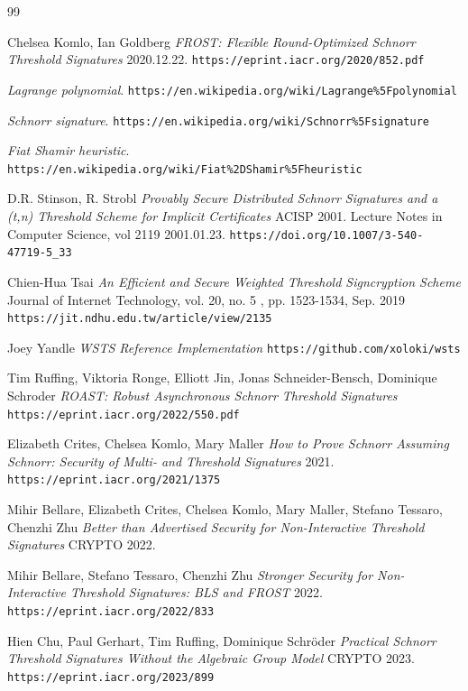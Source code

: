 \documentclass{article}
\theoremstyle{plain}
\theoremstyle{definition}
\theoremstyle{remark}
\begin{document}
\begin{thebibliography}{99}

  Chelsea Komlo, Ian Goldberg
  \emph{FROST: Flexible Round-Optimized Schnorr Threshold Signatures} 2020.12.22.
  \texttt{https://eprint.iacr.org/2020/852.pdf}

  \emph{Lagrange polynomial}.
  \texttt{https://en.wikipedia.org/wiki/Lagrange\%5Fpolynomial}

  \emph{Schnorr signature}.
  \texttt{https://en.wikipedia.org/wiki/Schnorr\%5Fsignature}

  \emph{Fiat Shamir heuristic}.
  \texttt{https://en.wikipedia.org/wiki/Fiat\%2DShamir\%5Fheuristic}

  D.R. Stinson, R. Strobl
  \emph{Provably Secure Distributed Schnorr Signatures and a (t,n) Threshold Scheme for Implicit Certificates} ACISP 2001. Lecture Notes in Computer Science, vol 2119 2001.01.23.
  \texttt{https://doi.org/10.1007/3-540-47719-5\_33}

  Chien-Hua Tsai
  \emph{An Efficient and Secure Weighted Threshold Signcryption Scheme} Journal of Internet Technology, vol. 20, no. 5 , pp. 1523-1534, Sep. 2019
  \texttt{https://jit.ndhu.edu.tw/article/view/2135}

  Joey Yandle
  \emph{WSTS Reference Implementation}
  \texttt{https://github.com/xoloki/wsts}

  Tim Ruffing, Viktoria Ronge, Elliott Jin, Jonas Schneider-Bensch, Dominique Schroder
  \emph{ROAST: Robust Asynchronous Schnorr Threshold Signatures} 
  \texttt{https://eprint.iacr.org/2022/550.pdf}

  Elizabeth Crites, Chelsea Komlo, Mary Maller
  \emph{How to Prove Schnorr Assuming Schnorr: Security of Multi- and Threshold Signatures} 2021.
  \texttt{https://eprint.iacr.org/2021/1375}

  Mihir Bellare, Elizabeth Crites, Chelsea Komlo, Mary Maller, Stefano Tessaro, Chenzhi Zhu
  \emph{Better than Advertised Security for Non-Interactive Threshold Signatures} CRYPTO 2022.

  Mihir Bellare, Stefano Tessaro, Chenzhi Zhu
  \emph{Stronger Security for Non-Interactive Threshold Signatures: BLS and FROST} 2022.
  \texttt{https://eprint.iacr.org/2022/833}

  Hien Chu, Paul Gerhart, Tim Ruffing, Dominique Schr\"oder
  \emph{Practical Schnorr Threshold Signatures Without the Algebraic Group Model} CRYPTO 2023.
  \texttt{https://eprint.iacr.org/2023/899}


\end{thebibliography}
\end{document}
